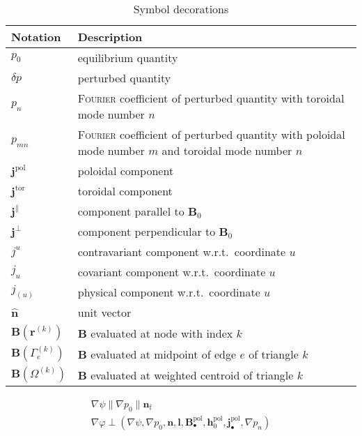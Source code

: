 \documentclass[a4paper, 10pt, english]{article}
\let\temp\varrho
\let\varrho\rho
\let\rho\temp
\let\temp\vartheta
\let\vartheta\theta
\let\theta\temp
\let\temp\varphi
\let\varphi\phi
\let\phi\temp
\let\vec\symbf
\newcommand*\pol{\ensuremath{\textrm{pol}}}  %
\newcommand*\tor{\ensuremath{\textrm{tor}}}  %
\newcommand*\fs{\ensuremath{\textrm{f}}}  %
\begin{document}
\begin{longtable}{l >{\RaggedRight}p{}}
  \caption{Symbol decorations} \\
  \toprule
  \textbf{Notation} & \textbf{Description} \\
  \midrule
  \endhead
  $p_{0}$ & equilibrium quantity \\
  $\delta p$ & perturbed quantity \\
  $p_{n}$ & \textsc{Fourier} coefficient of perturbed quantity with toroidal mode number $n$ \\
  $p_{m n}$ & \textsc{Fourier} coefficient of perturbed quantity with poloidal mode number $m$ and toroidal mode number $n$ \\
  \midrule
  $\vec{j}^{\pol}$ & poloidal component \\
  $\vec{j}^{\tor}$ & toroidal component \\
  $\vec{j}^{\parallel}$ & component parallel to $\vec{B}_{0}$ \\
  $\vec{j}^{\perp}$ & component perpendicular to $\vec{B}_{0}$ \\
  $j^{u}$ & contravariant component w.r.t.\ coordinate $u$ \\
  $j_{u}$ & covariant component w.r.t.\ coordinate $u$ \\
  $j_{(u)}$ & physical component w.r.t.\ coordinate $u$ \\
  $\hat{\vec{n}}$ & unit vector \\
  \midrule
  $\vec{B} (\vec{r}^{(k)})$ & $\vec{B}$ evaluated at node with index $k$ \\
  $\vec{B} (\Gamma_{e}^{(k)})$ & $\vec{B}$ evaluated at midpoint of edge $e$ of triangle $k$ \\
  $\vec{B} (\Omega^{(k)})$ & $\vec{B}$ evaluated at weighted centroid of triangle $k$ \\
  \bottomrule
\end{longtable}

\begin{gather*}
  \nabla \psi \parallel \nabla p_{0} \parallel \vec{n}_{\fs} \\
  \nabla \phi \perp \left( \nabla \psi, \nabla p_{0}, \vec{n}, \vec{l}, \vec{B}_{\bullet}^{\pol}, \vec{h}_{0}^{\pol}, \vec{j}_{\bullet}^{\pol}, \nabla p_{n} \right)
\end{gather*}
\end{document}
